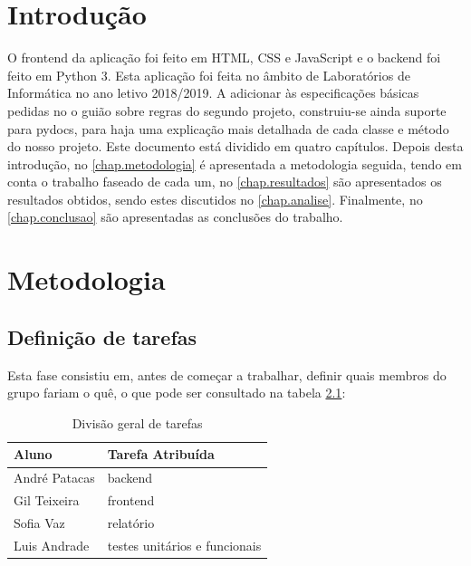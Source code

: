 \documentclass{report}
\begin{document}

\tableofcontents
 \listoftables     %
 \listoffigures    %


\clearpage
{}

\chapter{Introdução}
\label{chap.introducao}

O frontend da aplicação foi feito em \ac{HTML}, \ac{CSS} e JavaScript e o backend foi feito em Python 3. Esta aplicação foi feita no âmbito de Laboratórios de Informática no ano letivo 2018/2019.
A adicionar às especificações básicas pedidas no o guião sobre regras do segundo projeto, construiu-se ainda suporte para pydocs, para haja uma explicação mais detalhada de cada classe e método do nosso projeto.
Este documento está dividido em quatro capítulos.
Depois desta introdução,
no \autoref{chap.metodologia} é apresentada a metodologia seguida, tendo em conta o trabalho faseado de cada um, 
no \autoref{chap.resultados} são apresentados os resultados obtidos,
sendo estes discutidos no \autoref{chap.analise}.
Finalmente, no \autoref{chap.conclusao} são apresentadas
as conclusões do trabalho.

\chapter{Metodologia}
\label{chap.metodologia}
\section{Definição de tarefas}
Esta fase consistiu em, antes de começar a trabalhar, definir quais membros do grupo fariam o quê, o que pode ser consultado na tabela \ref{tab:table1}: 
\begin{table}[h!]
\begin{center}
\caption{Divisão geral de tarefas}
\begin{tabular}{l|l}
\hline
\multicolumn{1}{|l|}{Aluno} & \multicolumn{1}{l|}{Tarefa Atribuída} \\ \hline
            André Patacas   & backend                               \\ 
            Gil Teixeira      & frontend                               \\
            Sofia Vaz         & relatório                                \\
            Luis Andrade    & testes unitários e funcionais                     
\end{tabular}
\label{tab:table1}
\end{center}
\end{table}
\end{document}
